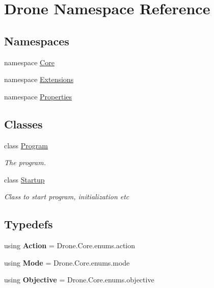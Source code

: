 \hypertarget{namespace_drone}{}\section{Drone Namespace Reference}
\label{namespace_drone}
\subsection*{Namespaces}
\begin{DoxyCompactItemize}
\item 
namespace \hyperlink{namespace_drone_1_1_core}{Core}
\item 
namespace \hyperlink{namespace_drone_1_1_extensions}{Extensions}
\item 
namespace \hyperlink{namespace_drone_1_1_properties}{Properties}
\end{DoxyCompactItemize}
\subsection*{Classes}
\begin{DoxyCompactItemize}
\item 
class \hyperlink{class_drone_1_1_program}{Program}
\begin{DoxyCompactList}\small\item\em The program. \end{DoxyCompactList}\item 
class \hyperlink{class_drone_1_1_startup}{Startup}
\begin{DoxyCompactList}\small\item\em Class to start program, initialization etc \end{DoxyCompactList}\end{DoxyCompactItemize}
\subsection*{Typedefs}
\begin{DoxyCompactItemize}
\item 
\hypertarget{namespace_drone_af18a13f7bfa687bd93c977d7bc974a17}{}using {\bfseries Action} = Drone.\+Core.\+enums.\+action\label{namespace_drone_af18a13f7bfa687bd93c977d7bc974a17}

\item 
\hypertarget{namespace_drone_a9e15c6ca07f9c84f11989b6fe271fac5}{}using {\bfseries Mode} = Drone.\+Core.\+enums.\+mode\label{namespace_drone_a9e15c6ca07f9c84f11989b6fe271fac5}

\item 
\hypertarget{namespace_drone_a0acd9927ab3578ff8348db8838ec67b8}{}using {\bfseries Objective} = Drone.\+Core.\+enums.\+objective\label{namespace_drone_a0acd9927ab3578ff8348db8838ec67b8}

\end{DoxyCompactItemize}
